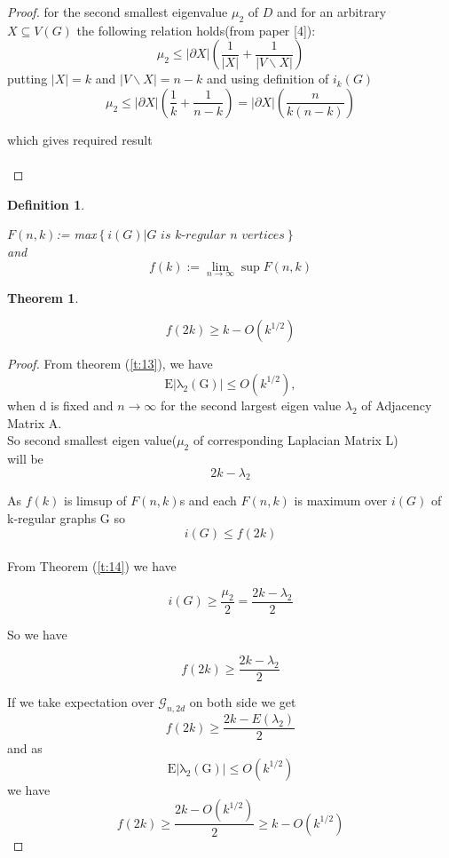 \documentclass[oneside]{book}
\newtheorem{theorem}{Theorem}[section]
\newtheorem{mydef}{Definition}[section]
\begin{document}
	\begin{proof}
		for the second smallest eigenvalue $\mu_{2}$ of $D$ and for an arbitrary $X \subseteq V(G)$ the following relation holds(from paper [4]):
		$$
		\mu_{2} \leq|\partial X|\left(\frac{1}{|X|}+\frac{1}{|V \backslash X|}\right)
		$$
		putting $|X| = k $ and $|V\backslash X| = n-k $ and using definition of $i_k(G)$ 
		$$ \mu_{2} \leq|\partial X|\left(\frac{1}{k}+\frac{1}{n-k}\right) = |\partial X|\left(\frac{n}{k(n-k)}\right) $$ \par
		which gives required result\\\\
	\end{proof} 
	
	\begin{mydef} \label{d:19}
		
		
		$F(n, k)$:= max$\left\{i(G)| \textit{G is k-regular  n vertices} \right\}$ \\
		and
		$$
		f(k):=\lim _{n \rightarrow \infty} \sup F(n, k)
		$$
	\end{mydef}
	
	
	\begin{theorem}
		\label{t:15}
		
		
		$$f(2 k) \geq k-O\left(k^{1 / 2}\right)$$ 
		
	\end{theorem}
	
	
	\begin{proof} 
		From theorem (\ref{t:13}), we have  $$\mathrm{E|\lambda_{2}(G)|}
		\leq O(k^{1/2}),$$ when d is fixed and $n\rightarrow \infty$ for the second largest eigen value $\lambda_{2}$ of Adjacency Matrix A. \\
		So second smallest eigen value($\mu_{2}$ of corresponding Laplacian Matrix L) \\will be 
		$$2k - \lambda_{2}$$ 
		
		
		As $f(k)$ is limsup of $F(n,k)$s and each $F(n,k)$ is maximum over $i(G)$ of k-regular graphs G
		so $$i(G)\leq f(2k)$$
		\\
		From Theorem (\ref{t:14}) we have
		
		$$i(G) \geq \frac{\mu_2}{2} = \frac{2k - \lambda_{2}}{2}  $$
		
		So we have
		
		$$
		f(2k) \geq \frac{2k - \lambda_{2}}{2}
		$$
		
		If we take expectation over $\mathscr{G}_{n, 2 d}$ on both side we get 
		$$
		f(2k) \geq \frac{2k - E(\lambda_{2})}{2}
		$$
		and as $$\mathrm{E|\lambda_{2}(G)|}
		\leq O(k^{1/2})$$ we have 
		$$
		f(2k) \geq \frac{2k - O(k^{1/2})}{2} \geq k - O(k^{1/2}) 
		$$
		
	\end{proof}  
	
\end{document}
